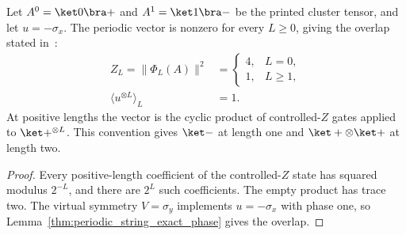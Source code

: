 \begin{lemma}
    \label{thm:cluster_periodic_string_exact}
    \leanok
    Let $A^0=\ket0\bra+$ and $A^1=\ket1\bra-$ be the printed cluster tensor,
    and let $u=-\sigma_x$. The periodic vector is nonzero for every
    $L\geq0$, giving the overlap stated
    in~\cite[line~411]{PerezGarcia2008StringOrder}:
    \begin{align}
        Z_L=\|\Phi_L(A)\|^2
                                       & =\begin{cases}4,&L=0,\\1,&L\geq1,\end{cases}
        \label{eq:cluster_periodic_normalization}                                     \\
        \langle u^{\otimes L}\rangle_L & =1.
        \label{eq:cluster_periodic_full_ring}
    \end{align}
    At positive lengths the vector is the cyclic product of controlled-$Z$
    gates applied to $\ket+^{\otimes L}$. This convention gives $\ket-$ at
    length one and $\ket+\otimes\ket+$ at length two.
\end{lemma}
\begin{proof}
    Every positive-length coefficient of the controlled-$Z$ state has
    squared modulus $2^{-L}$, and there are $2^L$ such coefficients.
    The empty product has trace two. The virtual symmetry $V=\sigma_y$
    implements $u=-\sigma_x$ with phase one, so
    Lemma~\ref{thm:periodic_string_exact_phase} gives the overlap.
\end{proof}
